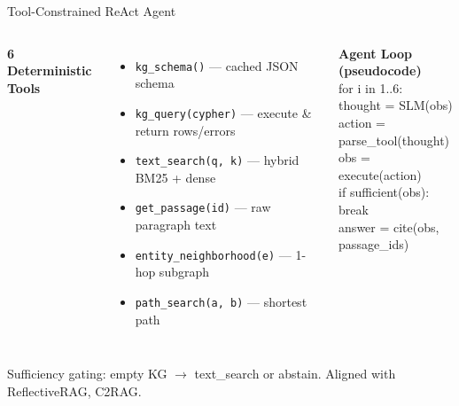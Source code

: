 \documentclass[aspectratio=169]{beamer}
\begin{document}
\begin{frame}{Tool-Constrained ReAct Agent}
\begin{columns}[T]
\textbf{6 Deterministic Tools}
\begin{itemize}
  \item \texttt{kg\_schema()} --- cached JSON schema
  \item \texttt{kg\_query(cypher)} --- execute \& return rows/errors
  \item \texttt{text\_search(q, k)} --- hybrid BM25 + dense
  \item \texttt{get\_passage(id)} --- raw paragraph text
  \item \texttt{entity\_neighborhood(e)} --- 1-hop subgraph
  \item \texttt{path\_search(a, b)} --- shortest path
\end{itemize}

\textbf{Agent Loop (pseudocode)}\\[3pt]
{\small\ttfamily
for i in 1..6:\\
\quad thought = SLM(obs)\\
\quad action = parse\_tool(thought)\\
\quad obs = execute(action)\\
\quad if sufficient(obs): break\\
answer = cite(obs, passage\_ids)
}
\end{columns}
\vspace{0.4em}
\small Sufficiency gating: empty KG $\rightarrow$ text\_search or abstain. Aligned with ReflectiveRAG, C2RAG.
\end{frame}
\end{document}
